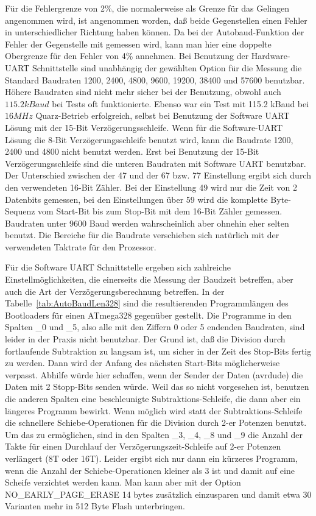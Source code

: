 Für die Fehlergrenze von 2\%, die normalerweise als Grenze für das Gelingen
angenommen wird, ist angenommen worden, daß beide Gegenstellen einen Fehler
in unterschiedlicher Richtung haben können. Da bei der Autobaud-Funktion
der Fehler der Gegenstelle mit gemessen wird, kann man hier eine doppelte
Obergrenze für den Fehler von 4\% annehmen.
Bei Benutzung der Hardware-UART Schnittstelle sind unabhängig der gewählten
Option für die Messung die Standard Baudraten 1200, 2400, 4800, 9600, 19200,
38400 und 57600 benutzbar.
Höhere Baudraten sind nicht mehr sicher bei der Benutzung, obwohl
auch \(115.2kBaud\) bei Tests oft funktionierte.
Ebenso war ein Test mit 115.2 kBaud bei \(16 MHz\) Quarz-Betrieb erfolgreich,
selbst bei Benutzung der Software UART Lösung mit der 15-Bit Verzögerungsschleife.
Wenn für die Software-UART Lösung die 8-Bit Verzögerungsschleife benutzt wird,
kann die Baudrate 1200, 2400 und 4800 nicht benutzt werden.
Erst bei Benutzung der 15-Bit Verzögerungsschleife sind die unteren Baudraten
mit Software UART benutzbar.
Der Unterschied zwischen der 47 und der 67 bzw. 77 Einstellung ergibt
sich durch den verwendeten 16-Bit Zähler. Bei der Einstellung 49 wird nur
die Zeit von 2 Datenbits gemessen, bei den Einstellungen über 59 wird
die komplette Byte-Sequenz vom Start-Bit bis zum Stop-Bit mit dem 16-Bit Zähler gemessen.
Baudraten unter 9600 Baud werden wahrscheinlich aber ohnehin eher selten benutzt.
Die Bereiche für die Baudrate verschieben sich natürlich mit der verwendeten
Taktrate für den Prozessor.

Für die Software UART Schnittstelle ergeben sich zahlreiche Einstellmöglichkeiten,
die einerseits die Messung der Baudzeit betreffen, aber auch die Art der
Verzögerungsberechnung betreffen.
In der Tabelle~\ref{tab:AutoBaudLen328} sind die resultierenden Programmlängen des Bootloaders für
einen  ATmega328 gegenüber gestellt. Die Programme in den Spalten \_0 und \_5, also alle 
mit den Ziffern 0 oder 5 endenden Baudraten, sind leider in der Praxis nicht benutzbar.
Der Grund ist, daß die Division durch fortlaufende Subtraktion zu langsam ist, um sicher
in der Zeit des Stop-Bits fertig zu werden. Dann wird der Anfang des nächsten Start-Bits
möglicherweise verpasst. Abhilfe würde hier schaffen, wenn der Sender der Daten (avrdude)
die Daten mit 2 Stopp-Bits senden würde.
Weil das so nicht vorgesehen ist, benutzen die anderen Spalten eine beschleunigte Subtraktions-Schleife,
die dann aber ein längeres Programm bewirkt.
Wenn möglich wird statt der Subtraktions-Schleife die schnellere Schiebe-Operationen
für die Division durch 2-er Potenzen benutzt. Um das zu ermöglichen, sind in den Spalten
\_3, \_4, \_8 und \_9 die Anzahl der Takte für einen Durchlauf der Verzögerungszeit-Schleife
auf 2-er Potenzen verlängert (8T oder 16T). Leider ergibt sich nur dann ein kürzeres Programm,
wenn die Anzahl der Schiebe-Operationen kleiner als 3 ist und damit auf eine Scheife verzichtet
werden kann. Man kann aber mit der Option NO\_EARLY\_PAGE\_ERASE 14 bytes zusätzlich einzusparen
und damit etwa 30 Varianten mehr in 512 Byte Flash unterbringen.

